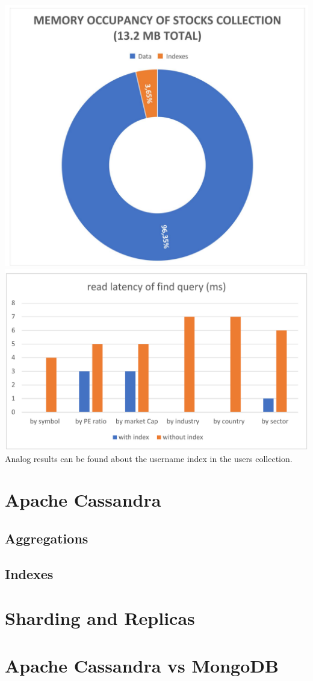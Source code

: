 \includegraphics[scale=0.11]{img/memory_mongo.png}
\includegraphics[scale=0.11]{img/latency_mongo.png}\\

Analog results can be found about the username index in the users collection.

\section{Apache Cassandra}

\subsection{Aggregations}
\subsection{Indexes}

\section{Sharding and Replicas}

\section{Apache Cassandra vs MongoDB}
